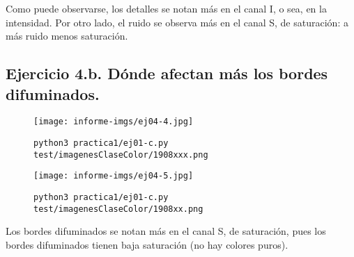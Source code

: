 \documentclass[11pt, spanish]{article}
\begin{document}
Como puede observarse, los detalles se notan más en el canal I, o sea, en la intensidad.
Por otro lado, el ruido se observa más en el canal S, de saturación: a más ruido menos saturación.

\subsection{Ejercicio 4.b. Dónde afectan más los bordes difuminados.}
\begin{figure}[H]
\centering
  \texttt{[image: informe-imgs/ej04-4.jpg]}
  \caption{\texttt{python3 practica1/ej01-c.py test/imagenesClaseColor/1908xxx.png}}
\end{figure}
\begin{figure}[H]
\centering
  \texttt{[image: informe-imgs/ej04-5.jpg]}
  \caption{\texttt{python3 practica1/ej01-c.py test/imagenesClaseColor/1908xx.png}}
\end{figure}

Los bordes difuminados se notan más en el canal S, de saturación, pues los bordes difuminados tienen baja saturación (no
hay colores puros).
\end{document}
